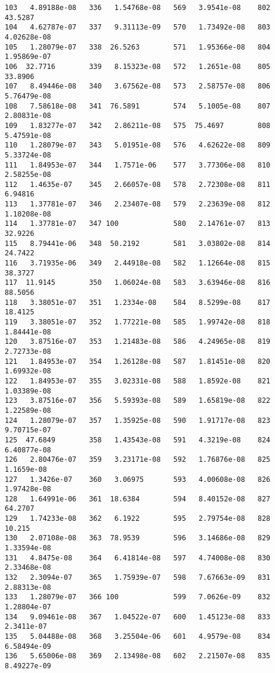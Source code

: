 \documentclass{article}
\begin{document}
\begin{verbatim}
103   4.89188e-08   336   1.54768e-08   569   3.9541e-08    802  43.5287
104   4.62787e-07   337   9.31113e-09   570   1.73492e-08   803   4.02628e-08
105   1.28079e-07   338  26.5263        571   1.95366e-08   804   1.95869e-07
106  32.7716        339   8.15323e-08   572   1.2651e-08    805  33.8906
107   8.49446e-08   340   3.67562e-08   573   2.58757e-08   806   5.76479e-08
108   7.58618e-08   341  76.5891        574   5.1005e-08    807   2.80831e-08
109   1.83277e-07   342   2.86211e-08   575  75.4697        808   5.47591e-08
110   1.28079e-07   343   5.01951e-08   576   4.62622e-08   809   5.33724e-08
111   1.84953e-07   344   1.7571e-06    577   3.77306e-08   810   2.58255e-08
112   1.4635e-07    345   2.66057e-08   578   2.72308e-08   811   6.94816
113   1.37781e-07   346   2.23407e-08   579   2.23639e-08   812   1.10208e-08
114   1.37781e-07   347 100             580   2.14761e-07   813  32.9226
115   8.79441e-06   348  50.2192        581   3.03802e-08   814  24.7422
116   3.71935e-06   349   2.44918e-08   582   1.12664e-08   815  38.3727
117  11.9145        350   1.06024e-08   583   3.63946e-08   816  88.5056
118   3.38051e-07   351   1.2334e-08    584   8.5299e-08    817  18.4125
119   3.38051e-07   352   1.77221e-08   585   1.99742e-08   818   1.84441e-08
120   3.87516e-07   353   1.21483e-08   586   4.24965e-08   819   2.72733e-08
121   1.84953e-07   354   1.26128e-08   587   1.81451e-08   820   1.69932e-08
122   1.84953e-07   355   3.02331e-08   588   1.8592e-08    821   1.03389e-08
123   3.87516e-07   356   5.59393e-08   589   1.65819e-08   822   1.22589e-08
124   1.28079e-07   357   1.35925e-08   590   1.91717e-08   823   9.70715e-07
125  47.6849        358   1.43543e-08   591   4.3219e-08    824   6.40877e-08
126   2.80476e-07   359   3.23171e-08   592   1.76876e-08   825   1.1659e-08
127   1.3426e-07    360   3.06975       593   4.00608e-08   826   1.97428e-08
128   1.64991e-06   361  18.6384        594   8.40152e-08   827  64.2707
129   1.74233e-08   362   6.1922        595   2.79754e-08   828  10.215
130   2.07108e-08   363  78.9539        596   3.14686e-08   829   1.33594e-08
131   4.8475e-08    364   6.41814e-08   597   4.74008e-08   830   2.33468e-08
132   2.3094e-07    365   1.75939e-07   598   7.67663e-09   831   2.88313e-08
133   1.28079e-07   366 100             599   7.0626e-09    832   1.28804e-07
134   9.09461e-08   367   1.04522e-07   600   1.45123e-08   833   2.3411e-07
135   5.04488e-08   368   3.25504e-06   601   4.9579e-08    834   6.58494e-09
136   5.65006e-08   369   2.13498e-08   602   2.21507e-08   835   8.49227e-09

\end{verbatim}
\end{document}
